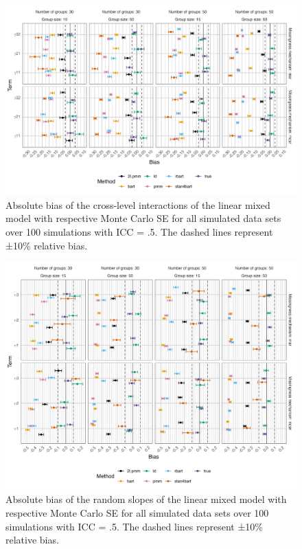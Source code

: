 \documentclass[10pt, a4paper, titlepage]{article}
\begin{document}
\begin{figure}[H]
    \centering
    \includegraphics[width=1\textwidth]{biascrosslevel.png}
    \caption{Absolute bias of the cross-level interactions of the linear mixed model with respective Monte Carlo SE for all simulated data sets over 100 simulations with ICC = .5. The dashed lines represent ±10\% relative bias.}
    \label{fig:biascrosslevel}
\end{figure}

\begin{figure}[H]
    \centering
    \includegraphics[width=1\textwidth]{biasrandom.png}
    \caption{Absolute bias of the random slopes of the linear mixed model with respective Monte Carlo SE for all simulated data sets over 100 simulations with ICC = .5. The dashed lines represent ±10\% relative bias.}
    \label{fig:biasrandom}
\end{figure}
\end{document}
